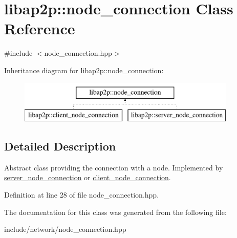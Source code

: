 \hypertarget{classlibap2p_1_1node__connection}{\section{libap2p\-:\-:node\-\_\-connection Class Reference}
\label{classlibap2p_1_1node__connection}
}


{\ttfamily \#include $<$node\-\_\-connection.\-hpp$>$}

Inheritance diagram for libap2p\-:\-:node\-\_\-connection\-:\begin{figure}[H]
\begin{center}
\leavevmode
\includegraphics[height=2.000000cm]{classlibap2p_1_1node__connection}
\end{center}
\end{figure}


\subsection{Detailed Description}
Abstract class providing the connection with a node. Implemented by \hyperlink{classlibap2p_1_1server__node__connection}{server\-\_\-node\-\_\-connection} or \hyperlink{classlibap2p_1_1client__node__connection}{client\-\_\-node\-\_\-connection}. 

Definition at line 28 of file node\-\_\-connection.\-hpp.



The documentation for this class was generated from the following file\-:\begin{DoxyCompactItemize}
\item 
include/network/node\-\_\-connection.\-hpp\end{DoxyCompactItemize}
